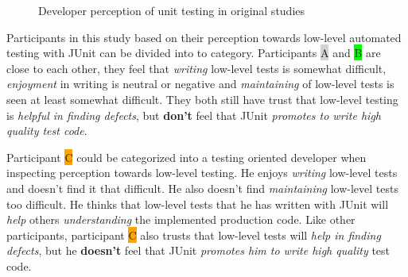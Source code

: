     \begin{figure}[ht]%
        \centering
        \qquad
        \caption{Developer perception of unit testing in original studies}%
        \label{fig:org-perception-two}%
    \end{figure}

Participants in this study based on their perception towards low-level automated testing with JUnit can be divided into
to category. Participants {\colorbox{lightgray}A} and {\colorbox{lime}B} are close to each other, they feel that
\textit{writing} low-level tests is somewhat difficult, \textit{enjoyment} in writing is neutral or negative and \textit{maintaining}
of low-level tests is seen at least somewhat difficult. They both still have trust that low-level testing is \textit{helpful in
finding defects}, but \textbf{don't} feel that JUnit \textit{promotes to write high quality test code}.

Participant {\colorbox{orange}C} could be categorized into a testing oriented developer when inspecting perception towards
low-level testing. He enjoys \textit{writing} low-level tests and doesn't find it that difficult. He also doesn't find
\textit{maintaining} low-level tests too difficult. He thinks that low-level tests that he has written with JUnit will \textit{help} others \textit{understanding}
the implemented production code. Like other participants, participant {\colorbox{orange}C} also trusts that low-level
tests will \textit{help in finding defects}, but he \textbf{doesn't} feel that JUnit \textit{promotes him to write high quality} test code.


